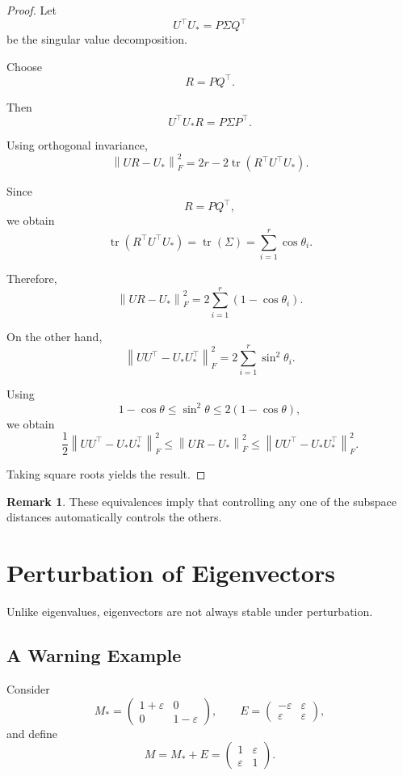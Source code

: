 \documentclass[12pt,oneside]{book}
\numberwithin{equation}{section}
\theoremstyle{definition}
\newtheorem{remark}{Remark}[section]
\theoremstyle{plain}
\theoremstyle{remark}
\newcommand{\norm}[1]{\left\lVert #1 \right\rVert}
\newcommand{\tr}{\operatorname{tr}}
\begin{document}
\begin{proof}
Let
\[
U^\top U_*
=
P\Sigma Q^\top
\]
be the singular value decomposition.

Choose
\[
R=PQ^\top.
\]

Then
\[
U^\top U_*R
=
P\Sigma P^\top.
\]

Using orthogonal invariance,
\[
\norm{UR-U_*}_F^2
=
2r-2\tr(R^\top U^\top U_*).
\]

Since
\[
R=PQ^\top,
\]
we obtain
\[
\tr(R^\top U^\top U_*)
=
\tr(\Sigma)
=
\sum_{i=1}^r \cos\theta_i.
\]

Therefore,
\[
\norm{UR-U_*}_F^2
=
2\sum_{i=1}^r (1-\cos\theta_i).
\]

On the other hand,
\[
\norm{UU^\top-U_*U_*^\top}_F^2
=
2\sum_{i=1}^r \sin^2\theta_i.
\]

Using
\[
1-\cos\theta
\leq
\sin^2\theta
\leq
2(1-\cos\theta),
\]
we obtain
\[
\frac{1}{2}
\norm{UU^\top-U_*U_*^\top}_F^2
\leq
\norm{UR-U_*}_F^2
\leq
\norm{UU^\top-U_*U_*^\top}_F^2.
\]

Taking square roots yields the result.
\end{proof}

\begin{remark}
These equivalences imply that controlling any one of the subspace distances automatically controls the others.
\end{remark}

\section{Perturbation of Eigenvectors}

Unlike eigenvalues, eigenvectors are not always stable under perturbation.

\subsection{A Warning Example}

Consider
\[
M_*=
\begin{pmatrix}
1+\varepsilon & 0\\
0 & 1-\varepsilon
\end{pmatrix},
\qquad
E=
\begin{pmatrix}
-\varepsilon & \varepsilon\\
\varepsilon & \varepsilon
\end{pmatrix},
\]
and define
\[
M=M_*+E
=
\begin{pmatrix}
1 & \varepsilon\\
\varepsilon & 1
\end{pmatrix}.
\]
\end{document}
